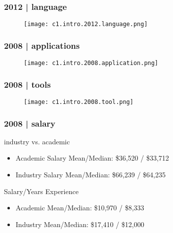 \begin{frame}
  \frametitle{2012 | language}
   \begin{figure}
     \centering
     \texttt{[image: c1.intro.2012.language.png]}
   \end{figure}
\end{frame}

\begin{frame}
  \frametitle{2008 | applications}
   \begin{figure}
     \centering
     \texttt{[image: c1.intro.2008.application.png]}
   \end{figure}
\end{frame}

\begin{frame}
  \frametitle{2008 | tools}
   \begin{figure}
     \centering
     \texttt{[image: c1.intro.2008.tool.png]}
   \end{figure}
\end{frame}

\begin{frame}
  \frametitle{2008 | salary}
  \begin{block}{industry vs. academic}
    \begin{itemize}
      \item Academic Salary Mean/Median: \$36,520 / \$33,712
      \item Industry Salary Mean/Median: \$66,239 / \$64,235
    \end{itemize}
  \end{block}
  \pause
  \begin{block}{Salary/Years Experience}
    \begin{itemize}
      \item Academic Mean/Median: \$10,970 / \$8,333
      \item Industry Mean/Median: \$17,410 / \$12,000
    \end{itemize}
  \end{block}
\end{frame}

